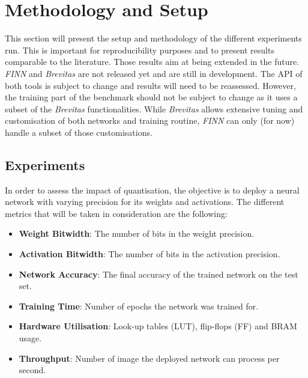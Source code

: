 
\section{Methodology and Setup}

This section will present the setup and methodology of the different experiments run. This is important for reproducibility purposes and to present results comparable to the literature. Those results aim at being extended in the future. \emph{FINN} and \emph{Brevitas} are not released yet and are still in development. The API of both tools is subject to change and results will need to be reassessed. However, the training part of the benchmark should not be subject to change as it uses a subset of the \emph{Brevitas} functionalities. While \emph{Brevitas} allows extensive tuning and customisation of both networks and training routine, \emph{FINN} can only (for now) handle a subset of those customisations.


\subsection{Experiments}

In order to assess the impact of quantisation, the objective is to deploy a neural network with varying precision for its weights and activations. The different metrics that will be taken in consideration are the following:

\begin{itemize}
  \item \textbf{Weight Bitwidth}: The number of bits in the weight precision.
  \item \textbf{Activation Bitwidth}: The number of bits in the activation precision.
  \item \textbf{Network Accuracy}: The final accuracy of the trained network on the test set.
  \item \textbf{Training Time}: Number of epochs the network was trained for.
  \item \textbf{Hardware Utilisation}: Look-up tables (LUT), flip-flops (FF) and BRAM usage.
  \item \textbf{Throughput}: Number of image the deployed network can process per second.
\end{itemize}

